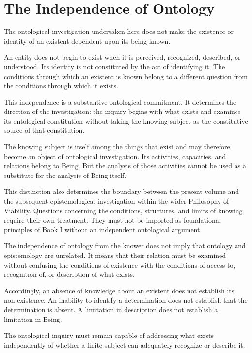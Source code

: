 \section*{The Independence of Ontology}

The ontological investigation undertaken here
does not make the existence or identity of
an existent dependent upon its being known.

An entity does not begin to exist when it is
perceived, recognized, described, or understood.
Its identity is not constituted by the act
of identifying it. The conditions through
which an existent is known belong to a different
question from the conditions through which
it exists.

This independence is a substantive ontological
commitment. It determines the direction of
the investigation: the inquiry begins with
what exists and examines its ontological
constitution without taking the knowing subject
as the constitutive source of that constitution.

The knowing subject is itself among the things
that exist and may therefore become an object
of ontological investigation. Its activities,
capacities, and relations belong to Being.
But the analysis of those activities cannot
be used as a substitute for the analysis
of Being itself.

This distinction also determines the boundary
between the present volume and the subsequent
epistemological investigation within the wider
Philosophy of Viability. Questions concerning
the conditions, structures, and limits of
knowing require their own treatment. They
must not be imported as foundational principles
of Book I without an independent ontological
argument.

The independence of ontology from the knower
does not imply that ontology and epistemology
are unrelated. It means that their relation
must be examined without confusing the
conditions of existence with the conditions
of access to, recognition of, or description
of what exists.

Accordingly, an absence of knowledge about
an existent does not establish its non-existence.
An inability to identify a determination
does not establish that the determination
is absent. A limitation in description does
not establish a limitation in Being.

The ontological inquiry must remain capable
of addressing what exists independently of
whether a finite subject can adequately
recognize or describe it.


